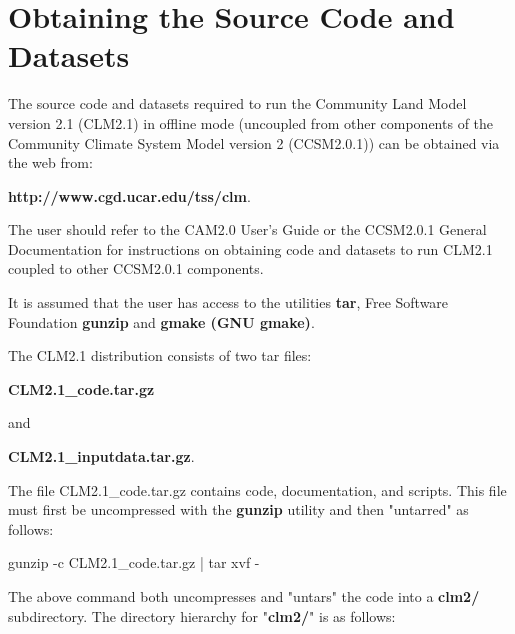 \section{Obtaining the Source Code and Datasets}

The source code and datasets required to run the Community Land Model
version 2.1 (CLM2.1) in offline mode (uncoupled from other components
of the Community Climate System Model version 2 (CCSM2.0.1)) can be
obtained via the web from:

\bigskip
{\bf http://www.cgd.ucar.edu/tss/clm}.
\bigskip

The user should refer to the CAM2.0 User's Guide or the CCSM2.0.1 General
Documentation for instructions on obtaining code and datasets to run CLM2.1
coupled to other CCSM2.0.1 components.

It is assumed that the user has access to the utilities {\bf tar},
Free Software Foundation {\bf gunzip} and {\bf gmake (GNU gmake)}.

The CLM2.1 distribution consists of two tar files:

\bigskip
{\bf CLM2.1\_code.tar.gz}
\bigskip

and

\bigskip
{\bf CLM2.1\_inputdata.tar.gz}.
\bigskip

The file CLM2.1\_code.tar.gz contains code, documentation, and
scripts. This file must first be uncompressed with the {\bf gunzip}
utility and then "untarred" as follows:

\bigskip
gunzip -c CLM2.1\_code.tar.gz | tar xvf -
\bigskip

The above command both uncompresses and "untars" the code into a {\bf clm2/}
subdirectory. The directory hierarchy for "{\bf clm2/}" is as follows:

\bigskip

